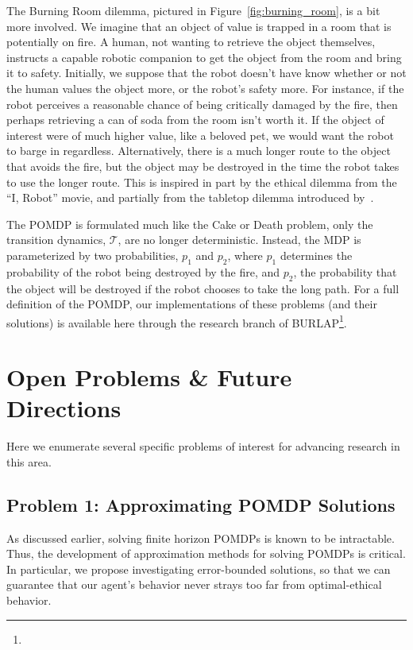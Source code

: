 \documentclass[11pt]{article}
\begin{document}
The Burning Room dilemma, pictured in Figure~\ref{fig:burning_room}, is a bit more involved. We imagine that an object of value is trapped in a room that is potentially on fire. A human, not wanting to retrieve the object themselves, instructs a capable robotic companion to get the object from the room and bring it to safety. Initially, we suppose that the robot doesn't have know whether or not the human values the object more, or the robot's safety more. For instance, if the robot perceives a reasonable chance of being critically damaged by the fire, then perhaps retrieving a can of soda from the room isn't worth it. If the object of interest were of much higher value, like a beloved pet, we would want the robot to barge in regardless. Alternatively, there is a much longer route to the object that avoids the fire, but the object may be destroyed in the time the robot takes to use the longer route. This is inspired in part by the ethical dilemma from the ``I, Robot'' movie, and partially from the tabletop dilemma introduced by~\cite{briggs2015sorry}.

The POMDP is formulated much like the Cake or Death problem, only the transition dynamics, $\mathcal{T}$, are no longer deterministic. Instead, the MDP is parameterized by two probabilities, $p_1$ and $p_2$, where $p_1$ determines the probability of the robot being destroyed by the fire, and $p_2$, the probability that the object will be destroyed if the robot chooses to take the long path. For a full definition of the POMDP, our implementations of these problems (and their solutions) is available here through the research branch of BURLAP\footnote{}.




\section{Open Problems \& Future Directions}

Here we enumerate several specific problems of interest for advancing research in this area.

\subsection{Problem 1: Approximating POMDP Solutions}  As discussed earlier, solving finite horizon POMDPs is known to be intractable. Thus, the development of approximation methods for solving POMDPs is critical. In particular, we propose investigating error-bounded solutions, so that we can guarantee that our agent's behavior never strays too far from optimal-ethical behavior.
\end{document}
